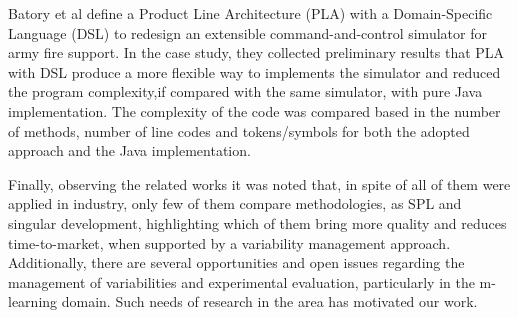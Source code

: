 Batory et al \cite{batory02} define a Product Line Architecture (PLA) with a Domain-Specific Language (DSL) to redesign an extensible command-and-control simulator for army fire support. In the case study, they collected preliminary results that PLA with DSL produce a more flexible way to implements the simulator and reduced the program complexity,if compared with the same simulator, with pure Java implementation. The complexity of the code was compared based in the number of methods, number of line codes and tokens/symbols for both the adopted approach and the Java implementation.

Finally, observing the related works it was noted that, in spite of all of them were applied in industry, only few of them compare methodologies, as SPL and singular development, highlighting which of them bring more quality and reduces time-to-market, when supported by a variability management approach. Additionally, there are several opportunities and open issues regarding the management of variabilities and experimental evaluation, particularly in the m-learning domain. Such needs of research in the area has motivated our work.